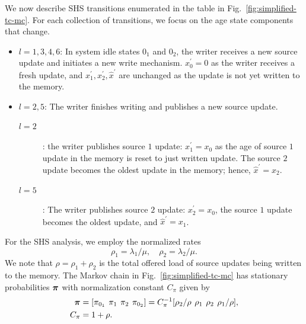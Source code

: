 \documentclass[conference, 10pt]{IEEEtran}
\newcommand{\rowvec}[1]{[\begin{matrix} #1\end{matrix}]}
\newcommand{\rvec}[1]{\smrvec{#1}}
\newcommand{\smrvec}[1]{\setlength\arraycolsep{2pt}\rowvec{#1}}
\newcommand{\piv}{\text{\boldmath{$\pi$}}}
\newcommand{\lam}{\lambda}
\newcommand{\sig}{\sigma}
\newcommand{\mh}{\hat{\mu}}
\newcommand{\bt}{\beta}
\newcommand{\rh}{\hat{\rho}}
\begin{document}
We now describe SHS transitions enumerated in the table in Fig.~\ref{fig:simplified-tc-mc}. 
For each collection of transitions, we focus on the age state components 
that change.
\begin{itemize}
\item {$l=1,3,4,6$:} In system idle states $0_1$ and $0_2$, the writer receives a new source update and initiates a new write mechanism. $x_0^\prime = 0$ as the writer receives a fresh update, and $x_1^\prime , x_2^\prime, \hat{x}^\prime$ are unchanged as the update is not yet written to the memory. 

\item {$l=2, 5$:} The writer finishes writing and publishes a new source update. 
    \begin{description}
        \item[$l=2$]: the writer publishes source $1$ update: $x_1^\prime = x_0$ as the age of source $1$ update in the memory is reset to just written update. The source $2$ update becomes the oldest update in the memory; hence, 
        $\hat{x}^\prime = x_2$. 
        \item[$l=5$]: The writer publishes source $2$ update: $x_2^\prime = x_0$, the source $1$ update becomes the oldest update, and $\hat{x}^\prime = x_1$.
    \end{description} 
\end{itemize}
\noindent For the SHS analysis, we  employ  the normalized rates \begin{equation}
    \rho_1={\lam_1}/\mu,\quad \rho_2={\lam_2}/{\mu}.
\end{equation} 
We note that $\rho = \rho_1 + \rho_2$ is the total offered load of source updates being written to the memory. 
The Markov chain in Fig.~\ref{fig:simplified-tc-mc} has stationary probabilities $\piv$
with normalization constant $C_\pi$ given by
\begin{subequations}
\begin{align}
    \piv &=  \rvec{\pi_{0_1} & \pi_1 & \pi_2 & \pi_{0_2}}
    = C_\pi^{-1} \rvec{\rho_2 / \rho & \rho_1 & \rho_2 & \rho_1/ \rho},\\
C_\pi &= 1+\rho.
\end{align}
\end{subequations}
\end{document}
